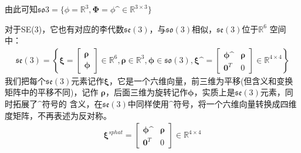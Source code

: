 \documentclass[10pt]{article}
\begin{document}
由此可知$\mathfrak{so}{3}=\{\phi=\mathbb{R}^{3},\mathbf{\Phi}=\phi\sphat \in\mathbb{R}^{3\times3}\}$

对于SE(3)，它也有对应的李代数$\mathfrak{se}(3)$，与$\mathfrak{so}(3)$相似，$\mathfrak{se}(3)$位于$\mathbb{R}^{6}$
空间中：
\begin{align} 
    \mathfrak{se}(3)=\left\{\mathbf{\xi}=\left[\begin{array}{c}\mathbf{\rho}\\\mathbf{\phi}
    \end{array}\right] \in\mathbb{R}^{6},\mathbf{\rho}\in\mathbb{R}^{3},\mathbf{\phi}\in\mathfrak{so}(3),
    \mathbf{\xi}\sphat=\left[\begin{array}{cc}\mathbf{\phi}\sphat & \mathbf{\rho}\\\mathbf{0}^{T} & 
        0\end{array}\right]\in\mathbb{R}^{4\times4}\right\} 
    \end{align}
我们把每个$\mathfrak{se}(3)$元素记作$\mathbf{\xi}$，它是一个六维向量，前三维为平移(但含义和变换矩阵中的平移不同)，记作
$\mathbf{\rho}$，后面三维为旋转记作$\mathbf{\phi}$，实质上是$\mathfrak{se}(3)$元素，同时拓展了$\sphat$符号的
含义，在$\mathfrak{se}(3)$中同样使用$\sphat$符号，将一个六维向量转换成四维度矩阵，不再表述为反对称。
\begin{align} 
    \mathbf{\xi}^{sphat}=\left[\begin{array}{cc}\mathbf{\phi}\sphat & \mathbf{\rho}\\
        \mathbf{0}^{T} & 0 \end{array}\right] \in\mathbb{R}^{4\times4}
    \end{align}
\end{document}
